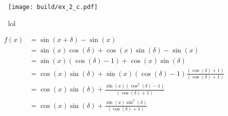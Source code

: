 \begin{figure}
    \centering
    \texttt{[image: build/ex\_2\_c.pdf]}
    \caption{lol}
    \label{fig:c}
\end{figure}
\begin{align*}
    f(x) &= \sin(x + \delta) - \sin(x)                                                              \\
    &= \sin(x) \cos(\delta) + \cos(x) \sin (\delta) - \sin(x)                                       \\
    &= \sin(x) (\cos(\delta) -1) + \cos(x) \sin(\delta)                                             \\
    &= \cos(x) \sin(\delta) + \sin(x) (\cos(\delta) -1) \frac{(\cos(\delta) +1)}{(\cos(\delta) +1)} \\
    &= \cos(x) \sin(\delta) + \frac{\sin(x) (\cos^2(\delta) - 1)}{(\cos(\delta) +1)}                \\
    &= \cos(x) \sin(\delta) + \frac{\sin(x) \sin^2(\delta)}{(\cos(\delta) +1)}                      \\
\end{align*}  